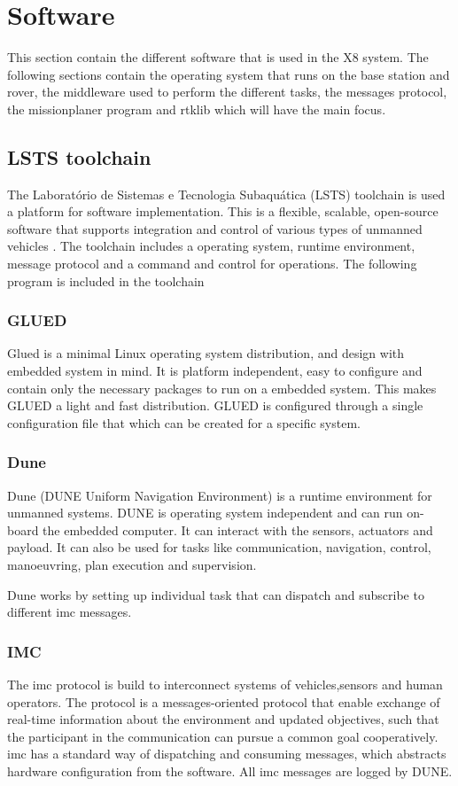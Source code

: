 \section{Software}\label{S:software}
This section contain the different software that is used in the X8 system. The following sections contain the operating system that runs on the base station and rover, the middleware used to perform the different tasks, the messages protocol, the missionplaner program and rtklib which will have the main focus.
\subsection{LSTS toolchain}
The Laboratório de Sistemas e Tecnologia Subaquática (LSTS) toolchain is used a platform for software implementation. This is a flexible, scalable, open-source software that supports integration and control of various types of unmanned vehicles \citep{pinto2013lsts}. The toolchain includes a operating system, runtime environment, message protocol and a command and control for operations. The following program is included in the toolchain
\subsubsection{GLUED}
Glued is a minimal Linux operating system distribution, and design with embedded system in mind. It is platform independent, easy to configure and contain only the necessary packages to run on a embedded system. This makes GLUED a light and fast distribution. GLUED is configured through a single configuration file that which can be created for a specific system. 
\subsubsection{Dune}
Dune (DUNE Uniform Navigation Environment) is a runtime environment for unmanned systems. DUNE is operating system independent and can run on-board the embedded computer. It can interact with the sensors, actuators and payload. It can also be used for tasks like communication, navigation, control, manoeuvring, plan execution and supervision.

Dune works by setting up individual task that can dispatch and subscribe to different \gls{imc} messages.
\subsubsection{IMC}\label{ss:IMC}
The \acrfull{imc} protocol is build to interconnect systems of vehicles,sensors and human operators. The protocol is a messages-oriented protocol that enable exchange of real-time information about the environment and updated objectives, such that the participant in the communication can pursue a common goal cooperatively.
\gls{imc} has a standard way of dispatching and consuming messages, which abstracts hardware configuration from the software. All \gls{imc} messages are logged by DUNE.

